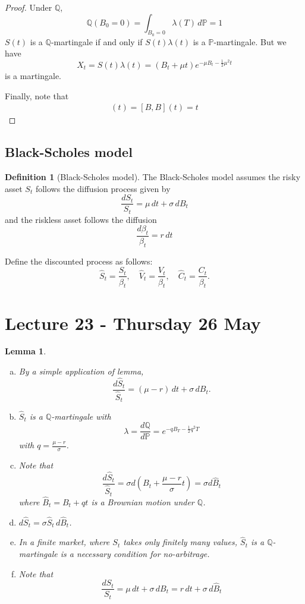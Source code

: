 \documentclass[10pt, oneside, reqno]{amsart}
\theoremstyle{plain}%
\newtheorem{lem}[thm]{Lemma}
\theoremstyle{definition}
\newtheorem{defn}[thm]{Definition}
\theoremstyle{remark}
\newcommand{\Q}{\mathbb{Q}}
\renewcommand{\P}{\mathbb{P}}
\begin{document}
\begin{proof}
	Under $\Q$, \[
		\Q(B_0 = 0) = \int_{B_0 = 0} \lambda(T) \, d\P = 1
	\]  $S(t)$ is a $\Q$-martingale if and only if $S(t) \lambda(t)$ is a $\P$-martingale.  But we have \[
		X_t = S(t) \lambda(t) = \left( B_t + \mu t \right) e^{- \mu B_t - \frac{1}{2} \mu^2 t}
	\] is a martingale.  
	
	Finally, note that \begin{align*}
		[S, S](t) = [ B, B](t) = t
	\end{align*}
\end{proof}

\subsection{Black-Scholes model} %
\label{sub:black_scholes_model}
\begin{defn}[Black-Scholes model]
	The Black-Scholes model assumes the risky asset $S_t$ follows the diffusion process given by \[
		\frac{dS_t}{S_t} = \mu \, dt + \sigma \, dB_t
	\] and the riskless asset follows the diffusion \[
		\frac{d\beta_t}{\beta_t} = r \, dt
	\]
	
Define the discounted process as follows:\[
	\hat S_t = \frac{S_t}{\beta_t}, \quad \hat V_t = \frac{V_t}{\beta_t}, \quad \hat C_t = \frac{C_t}{\beta_t}.
\]  
\end{defn}



\section{Lecture 23 - Thursday 26 May} %
\label{sec:lecture_23_thursday_26_may}

\begin{lem}{\ }
	\begin{enumerate}[(a)]
	\item By a simple application of \itos lemma, \[
		\frac{d\hat S_t}{\hat S_t} = (\mu - r) \, dt + \sigma \, dB_t.
	\]
	\item $\hat S_t$ is a $\Q$-martingale with \[
		\lambda = \frac{d \Q}{d \P} = e^{- q B_T - \frac{1}{2} q^2 T}
	\] with $ q = \frac{\mu - r}{\sigma}$.  
	
	\item Note that \[
		\frac{d \hat S_t}{\hat S_t} = \sigma d(B_t + \frac{\mu - r}{\sigma} t) = \sigma d \hat B_t
	\] where $\hat B_t = B_t + qt$ is a Brownian motion under $\Q$.  
	
	\item $d\hat S_t = \sigma \hat S_t \, d \hat B_t$.  
	\item In a finite market, where $S_t$ takes only finitely many values, $\hat S_t$ is a $\Q$-martingale is a necessary condition for no-arbitrage.
	\item Note that \[
		\frac{dS_t}{S_t} = \mu \, dt + \sigma \, dB_t = r \, dt + \sigma \, d \hat B_t
	\] 
	\end{enumerate}  
\end{lem}
\end{document}
